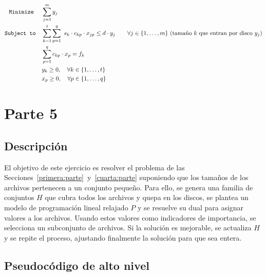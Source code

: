 \documentclass[11pt, a4paper, pdftex]{article}
\begin{document}
\begin{alignat*}{2}
	\minimize
	& \sum_{j = 1}^{m} y_{j}\\
	\subjto
	& \sum_{k=1}^{t} \sum_{p = 1}^{q}\ s_{k} \cdot c_{kp} \cdot x_{jp} \le d\cdot y_{j} \qquad \forall j \in \{1, \ldots, m\}\ \text{(tamaño $k$ que entran por disco $y_{j}$)}\\
	& \sum_{p = 1}^{q} c_{kp} \cdot x_{p} = f_{k} \\
	& y_{k} \ge 0, \quad \forall k \in \{1, \ldots, t\} \\
	& x_{p} \ge 0, \quad \forall p \in \{1, \ldots, q\}
\end{alignat*}

\section{Parte 5}\label{quinta:parte}

\subsection{Descripción}

El objetivo de este ejercicio es resolver el problema de las
Secciones~\ref{primera:parte}~y~\ref{cuarta:parte} suponiendo que los tamaños
de los archivos pertenecen a un conjunto pequeño. Para ello, se genera una
familia de conjuntos $H$ que cubra todos los archivos y quepa en los discos, se
plantea un modelo de programación lineal relajado $P$ y se resuelve su dual
para asignar valores a los archivos. Usando estos valores como indicadores de
importancia, se selecciona un subconjunto de archivos. Si la solución es
mejorable, se actualiza $H$ y se repite el proceso, ajustando finalmente la
solución para que sea entera.




\newpage
\subsection{Pseudocódigo de alto nivel}
\end{document}
